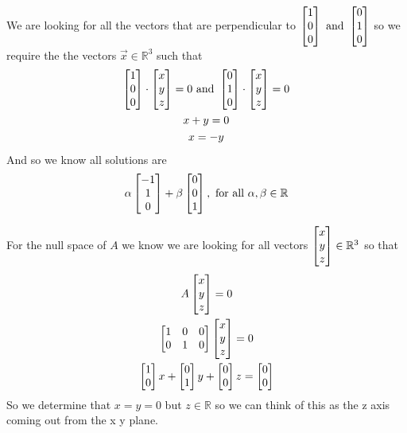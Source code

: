 \documentclass[11pt]{book}
\begin{document}
\begin{eg}
    We are looking for all the vectors that are perpendicular to $\begin{bmatrix} 1 \\ 0 \\ 0 \end{bmatrix} \text{ and  } \begin{bmatrix} 0 \\ 1 \\ 0 \end{bmatrix}$ so we require the the vectors $\vec{x} \in \mathbb{R}^3$ such that 
    \begin{gather*}
        \begin{bmatrix} 1 \\ 0 \\ 0 \end{bmatrix} \cdot \begin{bmatrix} x \\ y \\ z \end{bmatrix} = 0 \text{ and } \begin{bmatrix} 0 \\ 1 \\ 0 \end{bmatrix} \cdot \begin{bmatrix} x \\ y \\ z \end{bmatrix} = 0\\
        x + y = 0\\
        x = -y
    \end{gather*}
    And so we know all solutions are 
    \begin{equation*}
        \alpha \begin{bmatrix} -1 \\ 1 \\ 0 \end{bmatrix} + \beta \begin{bmatrix} 0 \\ 0 \\ 1 \end{bmatrix}, \text{ for all } \alpha, \beta \in \mathbb{R}
    \end{equation*}
\end{eg}

\begin{eg}
    For the null space of $A$ we know we are looking for all vectors $\begin{bmatrix} x \\ y \\ z \end{bmatrix} \in \mathbb{R}^3$ so that
    \begin{gather*}
        A \begin{bmatrix} x \\ y \\ z \end{bmatrix} = 0 \\
        \begin{bmatrix} 1 & 0 & 0 \\ 0 & 1 & 0 \end{bmatrix} \begin{bmatrix} x \\ y  \\ z \end{bmatrix} = 0\\
        \begin{bmatrix} 1 \\ 0 \end{bmatrix}x  + \begin{bmatrix} 0 \\ 1 \end{bmatrix}y   + \begin{bmatrix} 0 \\ 0 \end{bmatrix}z   = \begin{bmatrix} 0 \\ 0 \end{bmatrix}
    \end{gather*}
    So we determine that $x = y = 0$ but $z \in \mathbb{R}$ so we can think of this as the z axis coming out from the x y plane.
\end{eg}
\end{document}
